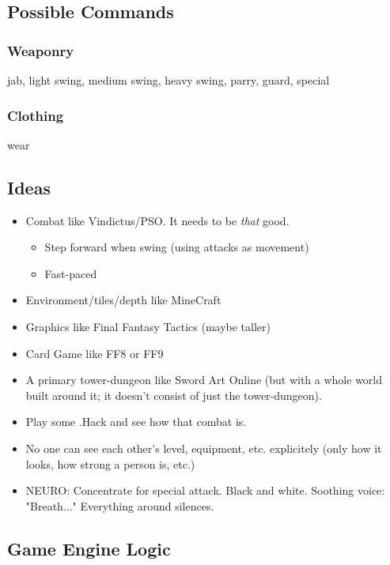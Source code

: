 \documentclass{article}
\begin{document}
\subsection*{Possible Commands} \subsubsection*{Weaponry} jab, light
swing, medium swing, heavy swing, parry, guard, special

\subsubsection*{Clothing} wear

\bigskip
\bigskip

\hline 

\subsection*{Ideas}
\begin{itemize}
    \item Combat like Vindictus/PSO. It needs to be \textit{that} good.
        \begin{itemize}
            \item Step forward when swing (using attacks as movement)
            \item Fast-paced
        \end{itemize}
    \item Environment/tiles/depth like MineCraft
    \item Graphics like Final Fantasy Tactics (maybe taller)
    \item Card Game like FF8 or FF9
    \item A primary tower-dungeon like Sword Art Online (but with a 
        whole world built around it; it doesn't consist of just the
        tower-dungeon).
    \item Play some .Hack and see how that combat is.
    \item No one can see each other's level, equipment, etc.  
        explicitely (only how it looks, how strong a person is, etc.)
    \item NEURO: Concentrate for special attack. Black and white.  
        Soothing voice: "Breath..." Everything around silences.


\end{itemize}

\subsection*{Game Engine Logic}
\end{document}
